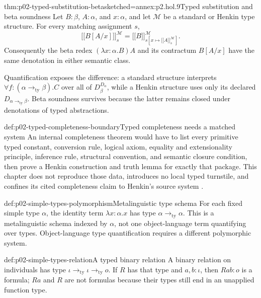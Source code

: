 \begin{hblemma}{thm:p02-typed-substitution-beta}{sketched=annex:p2.hol.9}{Typed substitution and beta soundness}
Let \(B:\beta\), \(A:\alpha\), and \(x:\alpha\), and let \(\mathcal M\)
be a standard or Henkin type structure.  For every matching assignment \(s\),
\[
 \lbrack\!\lbrack B[A/x]\rbrack\!\rbrack_s^{\mathcal M}
 =\lbrack\!\lbrack B\rbrack\!\rbrack_{s[x\mapsto
      \lbrack\!\lbrack A\rbrack\!\rbrack_s^{\mathcal M}]}^{\mathcal M}.
\]
Consequently the beta redex \((\lambda x{:}\alpha.B)A\) and its contractum
\(B[A/x]\) have the same denotation in either semantic class.
\end{hblemma}

Quantification exposes the difference: a standard structure interprets
\(\forall f{:}(\alpha\mathbin{\to_{\mathrm{ty}}}\beta).C\) over all of
\(D_\beta^{D_\alpha}\), while a Henkin structure uses only its declared
\(D_{\alpha\mathbin{\to_{\mathrm{ty}}}\beta}\).  Beta soundness survives
because the latter remains closed under denotations of typed abstractions.

\begin{proofboundary}{def:p02-typed-completeness-boundary}{Typed completeness needs a matched system}
An internal completeness theorem would have to list every primitive typed
constant, conversion rule, logical axiom, equality and extensionality
principle, inference rule, structural convention, and semantic closure
condition, then prove a Henkin construction and truth lemma for exactly that
package.  This chapter does not reproduce those data, introduces no local
typed turnstile, and confines its cited completeness claim to Henkin's source
system \cite{Henkin1950,Church1940}.
\end{proofboundary}

\begin{hbexample}{def:p02-simple-types-polymorphism}{Metalinguistic type schema}
For each fixed simple type \(\alpha\), the identity term
\(\lambda x{:}\alpha.x\) has type
\(\alpha\mathbin{\to_{\mathrm{ty}}}\alpha\).  This is a metalinguistic
schema indexed by \(\alpha\), not one object-language term quantifying over
types.  Object-language type quantification requires a different polymorphic
system.
\end{hbexample}

\begin{hbexample}{def:p02-simple-types-relation}{A typed binary relation}
A binary relation on individuals has type
\(\iota\mathbin{\to_{\mathrm{ty}}}\iota
\mathbin{\to_{\mathrm{ty}}}o\).  If \(R\) has that type and
\(a,b:\iota\), then \(Rab:o\) is a formula; \(Ra\) and \(R\) are not
formulas because their types still end in an unapplied function type.
\end{hbexample}

